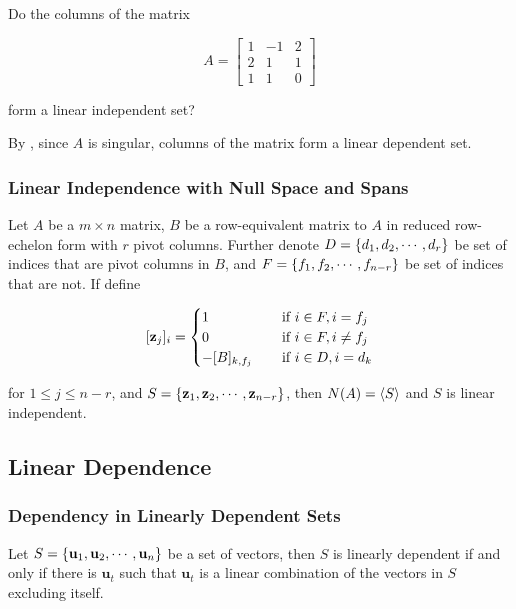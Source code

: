 \documentclass[a4paper,12pt]{article}
\begin{document}
\begin{exm}
  Do the columns of the matrix

  $$A=\begin{bmatrix}
    1 & -1 & 2\\
    2 & 1 & 1\\
    1 & 1 & 0
  \end{bmatrix}$$\s

  form a linear independent set?\n

  \ans By \rthm[\sctd{2}], since $A$ is singular, columns of the matrix form a linear dependent set.
\end{exm}

\subsubsection{Linear Independence with Null Space and Spans}
\begin{thm}
  Let $A$ be a $m\times n$ matrix, $B$ be a row-equivalent matrix to $A$ in reduced row-echelon form with $r$ pivot columns. Further denote $D=\left\{ d_{1},d_{2},\cdots,d_{r}\right\}$ be set of indices that are pivot columns in $B$, and $F=\left\{ f_{1},f_{2},\cdots,f_{n-r}\right\}$ be set of indices that are not. If define

  $$[\mathbf{z}_{j}]_{i}=\begin{cases}
    1&\;\;\;\;\text{if }i\in F,i=f_{j}\\
    0&\;\;\;\;\text{if }i\in F,i\neq f_{j}\\
    -[B]_{k,f_{j}}&\;\;\;\;\text{if }i\in D,i=d_{k}
  \end{cases}$$\s

  for $1\leq j\leq n-r$, and $S=\left\{ \mathbf{z}_{1},\mathbf{z}_{2},\cdots,\mathbf{z}_{n-r}\right\}$, then $N(A)=\left\langle S\right\rangle$ and $S$ is linear independent.
\end{thm}

\subsection{Linear Dependence}
\subsubsection{Dependency in Linearly Dependent Sets}
\begin{thm}
  Let $S=\left\{ \mathbf{u}_{1},\mathbf{u}_{2},\cdots,\mathbf{u}_{n}\right\}$ be a set of vectors, then $S$ is linearly dependent if and only if there is $\mathbf{u}_{t}$ such that $\mathbf{u}_{t}$ is a linear combination of the vectors in $S$ excluding itself.
\end{thm}
\end{document}
